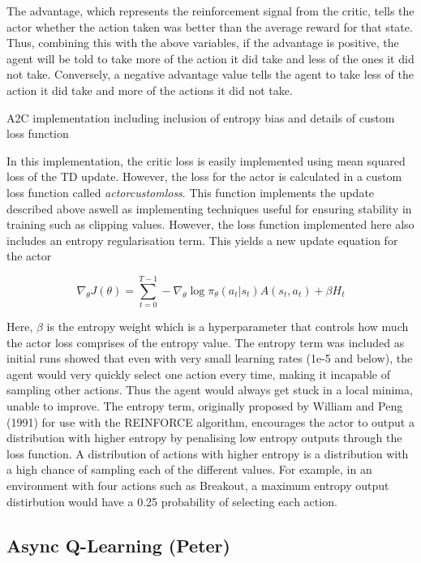 \documentclass{article}
\begin{document}
The advantage, which represents the reinforcement signal from the critic, tells the actor whether the action taken was better than the average reward for that state. Thus, combining this with the above variables, if the advantage is positive, the agent will be told to take more of the action it did take and less of the ones it did not take. Conversely, a negative advantage value tells the agent to take less of the action it did take and more of the actions it did not take.

A2C implementation including inclusion of entropy bias and details of custom loss function

In this implementation, the critic loss is easily implemented using mean squared loss of the TD update. However, the loss for the actor is calculated in a custom loss function called \emph{actorcustomloss}. This function implements the update described above aswell as implementing techniques useful for ensuring stability in training such as clipping values. However, the loss function implemented here also includes an entropy regularisation term. This yields a new update equation for the actor


\begin{equation}
\nabla_{\theta} J(\theta) = \sum_{t=0}^{T-1}-\nabla_{\theta}\log{\pi_{\theta}}(a_{t} | s_{t}) A(s_{t}, a_{t}) + \beta H_{t}
\end{equation}

Here, $\beta$ is the entropy weight which is a hyperparameter that controls how much the actor loss comprises of the entropy value. The entropy term was included as initial runs showed that even with very small learning rates (1e-5 and below), the agent would very quickly select one action every time, making it incapable of sampling other actions. Thus the agent would always get stuck in a local minima, unable to improve. The entropy term, originally proposed by William and Peng (1991) for use with the REINFORCE algorithm, encourages the actor to output a distribution with higher entropy by penalising low entropy outputs through the loss function. A distribution of actions with higher entropy is a distribution with a high chance of sampling each of the different values. For example, in an environment with four actions such as Breakout, a maximum entropy output distirbution would have a 0.25 probability of selecting each action.

\subsection{Async Q-Learning (Peter)}
\end{document}
